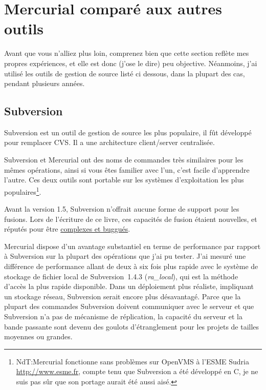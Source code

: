 \section{Mercurial comparé aux autres outils}

Avant que vous n'alliez plus loin, comprenez bien que cette section
reflète mes propres expériences, et elle est donc (j'ose le dire)
peu objective. Néanmoins, j'ai utilisé les outils de gestion de source
listé ci dessous, dans la plupart des cas, pendant plusieurs années.

\subsection{Subversion}

Subversion est un outil de gestion de source les plus populaire, il fût 
développé pour remplacer CVS. Il a une architecture client/server centralisée.

Subversion et Mercurial ont des noms de commandes très similaires pour 
les mêmes opérations, ainsi si vous êtes familier avec l'un, c'est facile
d'apprendre l'autre. Ces deux outils sont portable sur les systèmes 
d'exploitation les plus populaires\footnote{NdT:Mercurial fonctionne sans problèmes
sur OpenVMS à l'ESME Sudria \url{http://www.esme.fr}, compte tenu que Subversion a été 
développé en C, je ne suis pas sûr que son portage aurait été aussi aisé.}.

Avant la version 1.5, Subversion n'offrait aucune forme de support pour les fusions. Lors 
de l'écriture de ce livre, ces capacités de fusion étaient nouvelles, et réputés pour être
\href{http://svnbook.red-bean.com/nightly/en/svn.branchmerge.advanced.html#svn.branchmerge.advanced.finalword}{complexes
et buggués}.

Mercurial dispose d'un avantage substantiel en terme de performance par rapport à 
Subversion sur la plupart des opérations que j'ai pu tester. J'ai mesuré
une différence de performance allant de deux à six fois plus rapide avec
le système de stockage de fichier local de Subversion~1.4.3 
(\emph{ra\_local}), qui est la méthode d'accès la plus rapide disponible. Dans
un déploiement plus réaliste, impliquant un stockage réseau, Subversion 
serait encore plus désavantagé. Parce que la plupart des commandes Subversion
doivent communiquer avec le serveur et que Subversion n'a pas de mécanisme
de réplication, la capacité du serveur et la bande passante sont devenu des
goulots d'étranglement pour les projets de tailles moyennes ou grandes.

